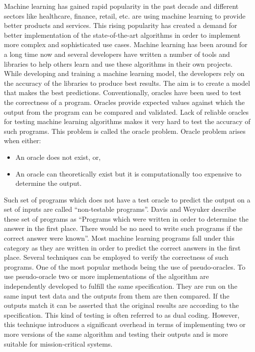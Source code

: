 Machine learning has gained rapid popularity in the past decade and different sectors like healthcare, finance, retail, etc. are using machine learning to provide better products and services. This rising popularity has created a demand for better implementation of the state-of-the-art algorithms in order to implement more complex and sophisticated use cases. Machine learning has been around for a long time now and several developers have written a number of tools and libraries to help others learn and use these algorithms in their own projects.  While developing and training a machine learning model, the developers rely on the accuracy of the libraries to produce best results. The aim is to create a model that makes the best predictions.
Conventionally, oracles have been used to test the correctness of a program. Oracles provide expected values against which the output from the program can be compared and validated. Lack of reliable oracles for testing machine learning algorithms makes it very hard to test the accuracy of such programs. This problem is called the oracle problem\cite{Weyuker}. Oracle problem arises when either:
\begin{itemize}
  \item An oracle does not exist, or,
  \item An oracle can theoretically exist but it is computationally too expensive to determine the output.
\end{itemize}
Such set of programs which does not have a test oracle to predict the output on a set of inputs are called \enquote{non-testable programs}\cite{Murphy}. Davis and Weyuker describe these set of programs as \enquote{Programs which were written in order to determine the answer in the first place. There would be no need to write such programs if the correct answer were known}\cite{Davis1981}. Most machine learning programs fall under this category as they are written in order to predict the correct answers in the first place. Several techniques can be employed to verify the correctness of such programs. One of the most popular methods being the use of pseudo-oracles. To use pseudo-oracle two or more implementations of the algorithm are independently developed to fulfill the same specification. They are run on the same input test data and the outputs from them are then compared. If the outputs match it can be asserted that the original results are according to the specification. This kind of testing is often referred to as dual coding. However, this technique introduces a significant overhead in terms of implementing two or more versions of the same algorithm and testing their outputs and is more suitable for mission-critical systems\cite{Weyuker}.\newline

